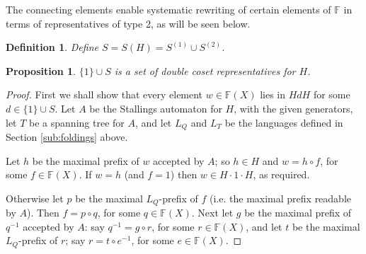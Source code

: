 \documentclass[a4paper,12pt]{article}
\newcommand{\G}{\Gamma }
\newtheorem{proposition}[theorem]{Proposition}
\newtheorem{definition}[theorem]{Definition}
\numberwithin{equation}{section}
\numberwithin{figure}{section}
\newcommand{\FF}{\ensuremath{\mathbb{F}}}
\begin{document}
The  connecting elements enable systematic rewriting of certain
elements of $\FF$ in terms of representatives of type 2, as will be
seen below.
\begin{definition}\label{def:dcreps} 
Define $S=S(H)=S^{(1)}\cup S^{(2)}$.
\end{definition}

\begin{proposition}\label{prop:dcreps}
$\{1\}\cup S$ is a set of double coset representatives for $H$.
\end{proposition}
\begin{proof}
First we shall show that every element $w\in \FF(X)$ lies in $HdH$ 
for some $d\in \{1\}\cup S$. 
Let $A$ be the Stallings automaton for $H$, with the 
given generators, let  $T$ be a spanning tree for $A$, and 
let $L_Q$ and $L_T$ be the languages defined in Section \ref{sub:foldings} above. 

Let $h$ be the maximal prefix of $w$ accepted by $A$; so $h\in H$ and
$w=h\circ f$, for some $f\in \FF(X)$. 
If $w=h$ (and $f=1$) then $w\in H\cdot 1\cdot H$, as required. 

Otherwise %
let $p$ be the maximal $L_Q$-prefix 
of $f$ (i.e. the maximal prefix readable by $A$). Then
  $f= p\circ q$, for some $q\in \FF(X)$. 
Next let $g$ be  the maximal prefix of $q^{-1}$ accepted by $A$: say
$q^{-1}=g\circ r$, for some $r\in \FF(X)$, and let $t$ be the maximal $L_Q$-prefix
 of $r$; say $r=t\circ e^{-1}$, for some $e\in \FF(X)$.


\end{proof}
\end{document}
